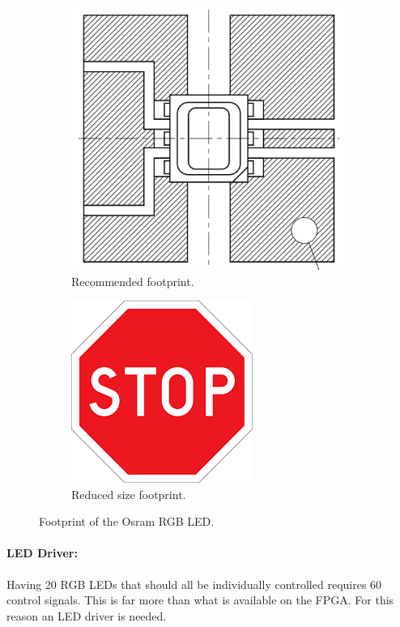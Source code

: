 \begin{figure}[H]
	\begin{subfigure}[t]{.49\linewidth}
		\centering
		\includegraphics[width=.8\linewidth]{images/rgbfootprint}
		\caption{Recommended footprint.}
		\label{fig:recommendedfootprint}
	\end{subfigure}
	\begin{subfigure}[t]{.49\linewidth}
		\centering
		\includegraphics[width=.8\linewidth]{images/stop}
		\caption{Reduced size footprint.}
		\label{fig:finalfootprint}
	\end{subfigure}
	\caption{Footprint of the Osram RGB LED.}
	\label{fig:footprint}
\end{figure}

\paragraph{LED Driver:}
Having 20 RGB LEDs that should all be individually controlled requires 60 control signals.
This is far more than what is available on the FPGA.
For this reason an LED driver is needed.
